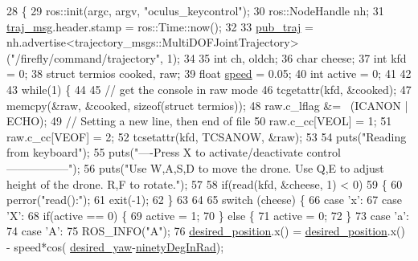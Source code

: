 \begin{DoxyCode}
28 \{
29   ros::init(argc, argv, \textcolor{stringliteral}{"oculus\_keycontrol"});
30   ros::NodeHandle nh;
31   \hyperlink{oculus-control-keyboard_8cpp_a090c0766fbb77862dd8cc0cca99d688b}{traj\_msg}.header.stamp = ros::Time::now();
32 
33   \hyperlink{oculus-control-keyboard_8cpp_a92b67ae724bc0d23b8e85e92e89403df}{pub\_traj} = nh.advertise<trajectory\_msgs::MultiDOFJointTrajectory>(\textcolor{stringliteral}{"/firefly/command/trajectory"}, 
      1);
34 
35   \textcolor{keywordtype}{int} ch, oldch;
36   \textcolor{keywordtype}{char} cheese;
37   \textcolor{keywordtype}{int} kfd = 0;
38   \textcolor{keyword}{struct }termios cooked, raw;
39   \textcolor{keywordtype}{float} \hyperlink{oculus-control-keyboard_8cpp_a7f7e4724cf57d59513b39c5ecc81adc8}{speed} = 0.05;
40   \textcolor{keywordtype}{int} active = 0;
41 
42 
43   \textcolor{keywordflow}{while}(1) \{
44 
45     \textcolor{comment}{// get the console in raw mode}
46     tcgetattr(kfd, &cooked);
47     memcpy(&raw, &cooked, \textcolor{keyword}{sizeof}(\textcolor{keyword}{struct} termios));
48     raw.c\_lflag &=~ (ICANON | ECHO);
49     \textcolor{comment}{// Setting a new line, then end of file}
50     raw.c\_cc[VEOL] = 1;
51     raw.c\_cc[VEOF] = 2;
52     tcsetattr(kfd, TCSANOW, &raw);
53 
54     puts(\textcolor{stringliteral}{"Reading from keyboard"});
55     puts(\textcolor{stringliteral}{"----Press X to activate/deactivate control-----------------"});
56     puts(\textcolor{stringliteral}{"Use W,A,S,D to move the drone. Use Q,E to adjust height of the drone. R,F to rotate."});
57 
58     \textcolor{keywordflow}{if}(read(kfd, &cheese, 1) < 0)
59     \{
60       perror(\textcolor{stringliteral}{"read():"});
61       exit(-1);
62     \}
63 
64 
65     \textcolor{keywordflow}{switch} (cheese) \{
66       \textcolor{keywordflow}{case} \textcolor{charliteral}{'x'}:
67       \textcolor{keywordflow}{case} \textcolor{charliteral}{'X'}:
68         \textcolor{keywordflow}{if}(active == 0) \{
69           active = 1;
70         \} \textcolor{keywordflow}{else} \{
71           active = 0;
72         \}
73       \textcolor{keywordflow}{case} \textcolor{charliteral}{'a'}:
74       \textcolor{keywordflow}{case} \textcolor{charliteral}{'A'}:
75         ROS\_INFO(\textcolor{stringliteral}{"A"});
76         \hyperlink{oculus-control-keyboard_8cpp_a608d9948c063034b7605598daaeccc3e}{desired\_position}.x() = \hyperlink{oculus-control-keyboard_8cpp_a608d9948c063034b7605598daaeccc3e}{desired\_position}.x() - speed*cos(
      \hyperlink{oculus-control-keyboard_8cpp_a03a69ef33d756512293e67791ab5f265}{desired\_yaw}-\hyperlink{oculus-control-keyboard_8cpp_a2cce9b626fdb3b1f78baad955bd5b609}{ninetyDegInRad});

\end{DoxyCode}
